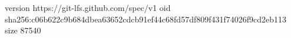 version https://git-lfs.github.com/spec/v1
oid sha256:c06b622c9b684dbea63652cdcb91ef44c68fd57df809f431f74026f9cd2eb113
size 87540
